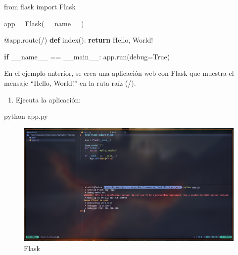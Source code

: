 \documentclass[
  a4paper,
  DIV=11,
  numbers=noendperiod,
  onepage,
  openany]{scrreprt}
\newenvironment{Shaded}{\begin{snugshade}}{\end{snugshade}}
\newcommand{\AttributeTok}[1]{\textcolor[rgb]{0.40,0.45,0.13}{#1}}
\newcommand{\ControlFlowTok}[1]{\textcolor[rgb]{0.00,0.23,0.31}{\textbf{#1}}}
\newcommand{\ExtensionTok}[1]{\textcolor[rgb]{0.00,0.23,0.31}{#1}}
\newcommand{\ImportTok}[1]{\textcolor[rgb]{0.00,0.46,0.62}{#1}}
\newcommand{\KeywordTok}[1]{\textcolor[rgb]{0.00,0.23,0.31}{\textbf{#1}}}
\newcommand{\NormalTok}[1]{\textcolor[rgb]{0.00,0.23,0.31}{#1}}
\newcommand{\OperatorTok}[1]{\textcolor[rgb]{0.37,0.37,0.37}{#1}}
\newcommand{\StringTok}[1]{\textcolor[rgb]{0.13,0.47,0.30}{#1}}
\newcommand{\VariableTok}[1]{\textcolor[rgb]{0.07,0.07,0.07}{#1}}
\providecommand{\tightlist}{%
  \setlength{\itemsep}{0pt}\setlength{\parskip}{0pt}}\usepackage{longtable,booktabs,array}
\begin{document}
\begin{Shaded}
\begin{Highlighting}[]
\ImportTok{from}\NormalTok{ flask }\ImportTok{import}\NormalTok{ Flask}

\NormalTok{app }\OperatorTok{=}\NormalTok{ Flask(}\VariableTok{\_\_name\_\_}\NormalTok{)}

\AttributeTok{@app.route}\NormalTok{(}\StringTok{\textquotesingle{}/\textquotesingle{}}\NormalTok{)}
\KeywordTok{def}\NormalTok{ index():}
    \ControlFlowTok{return} \StringTok{\textquotesingle{}Hello, World!\textquotesingle{}}

\ControlFlowTok{if} \VariableTok{\_\_name\_\_} \OperatorTok{==} \StringTok{\textquotesingle{}\_\_main\_\_\textquotesingle{}}\NormalTok{:}
\NormalTok{    app.run(debug}\OperatorTok{=}\VariableTok{True}\NormalTok{)}
\end{Highlighting}
\end{Shaded}

En el ejemplo anterior, se crea una aplicación web con Flask que muestra
el mensaje ``Hello, World!'' en la ruta raíz (/).

\begin{enumerate}
\def\labelenumi{\arabic{enumi}.}
\setcounter{enumi}{2}
\tightlist
\item
  Ejecuta la aplicación:
\end{enumerate}

\begin{Shaded}
\begin{Highlighting}[]
\ExtensionTok{python}\NormalTok{ app.py}
\end{Highlighting}
\end{Shaded}

\begin{figure}[H]

{\centering \includegraphics[width=8.33333in,height=\textheight,keepaspectratio]{unidades/unidad7/./images/flask_code001.png}

}

\caption{Flask}

\end{figure}%
\end{document}
